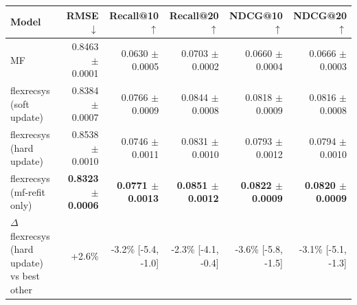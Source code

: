 \begin{tabular}{lrrrrr}
\toprule
Model & RMSE $\downarrow$ & Recall@10 $\uparrow$ & Recall@20 $\uparrow$ & NDCG@10 $\uparrow$ & NDCG@20 $\uparrow$ \\
\midrule
MF & 0.8463 $\pm$ 0.0001 & 0.0630 $\pm$ 0.0005 & 0.0703 $\pm$ 0.0002 & 0.0660 $\pm$ 0.0004 & 0.0666 $\pm$ 0.0003 \\
flexrecsys (soft update) & 0.8384 $\pm$ 0.0007 & 0.0766 $\pm$ 0.0009 & 0.0844 $\pm$ 0.0008 & 0.0818 $\pm$ 0.0009 & 0.0816 $\pm$ 0.0008 \\
flexrecsys (hard update) & 0.8538 $\pm$ 0.0010 & 0.0746 $\pm$ 0.0011 & 0.0831 $\pm$ 0.0010 & 0.0793 $\pm$ 0.0012 & 0.0794 $\pm$ 0.0010 \\
flexrecsys (mf-refit only) & \textbf{0.8323 $\pm$ 0.0006} & \textbf{0.0771 $\pm$ 0.0013} & \textbf{0.0851 $\pm$ 0.0012} & \textbf{0.0822 $\pm$ 0.0009} & \textbf{0.0820 $\pm$ 0.0009} \\
\midrule
$\Delta$ flexrecsys (hard update) vs best other & +2.6\% & -3.2\% [-5.4, -1.0] & -2.3\% [-4.1, -0.4] & -3.6\% [-5.8, -1.5] & -3.1\% [-5.1, -1.3] \\
\bottomrule
\end{tabular}
